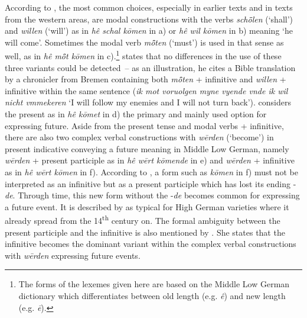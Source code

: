 \documentclass[output=paper,colorlinks,citecolor=brown]{langscibook}
\begin{document}
According to \citet[222--223, § 412, note 6]{Lasch1914}, the most common choices, especially in earlier texts and in texts from the western areas, are modal constructions with the verbs \textit{schȫlen} (‘shall’) and \textit{willen}  (‘will’) as in \textit{hê schal kōmen} in a) or \textit{hê wil kōmen} in b) meaning `he will come'. Sometimes the modal verb \textit{mö̂ten} %
(‘must’) is used in that sense as well, as in \textit{hê mö̂t kōmen} in c).\footnote{The forms of the lexemes given here are based on the Middle Low German dictionary \citep{MNWB} which differentiates between old length (e.g. \textit{ê}) and new length (e.g. \textit{ē}).} \citet[91, § 65]{Lübben1882} states that no differences in the use of these three variants could be detected~-- as an illustration, he cites a Bible translation by a chronicler from Bremen containing both \textit{mö̂ten} %
+ infinitive and \textit{willen}  + infinitive within the same sentence (\textit{ik mot voruolgen myne vyende vnde ik wil nicht vmmekeren} `I will follow my enemies and I will not turn back'). \citet[225]{Sarauw1924} considers the present as in \textit{hê kōmet} in d) the primary and mainly used option for expressing future. Aside from the present tense and modal verbs + infinitive, there are also two complex verbal constructions with \textit{wērden} (‘become’) in present indicative conveying a future meaning in Middle Low German, namely \textit{wērden} + present participle as in \textit{hê wērt kōmende} in e) and \textit{wērden} + infinitive as in \textit{hê wērt kōmen} in f). 
According to \citet[91, § 65]{Lübben1882}, a form such as \textit{kōmen} in f) must not be interpreted as an infinitive but as a present participle which has lost its ending -\textit{de}. Through time, this new form without the -\textit{de} becomes common for expressing a future event. 
It is described by \citet[92, § 65]{Lübben1882} as typical for High German varieties where it already spread from the 14\textsuperscript{th} century on.
The formal ambiguity between the present participle and the infinitive is also mentioned by \citet[222--223, § 412, note 6]{Lasch1914}. She states that the infinitive becomes the dominant variant within the complex verbal constructions with \textit{wērden} expressing future events.
\end{document}
